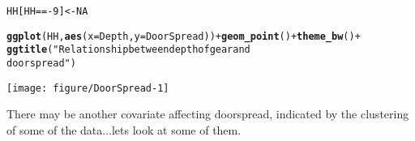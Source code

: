 \documentclass[12pt]{article}\usepackage[]{graphicx}\usepackage[]{color}
\makeatletter
\def\maxwidth{ %
  \ifdim\Gin@nat@width>\linewidth
    \linewidth
  \else
    \Gin@nat@width
  \fi
}
\newcommand{\hlnum}[1]{\textcolor[rgb]{0.686,0.059,0.569}{#1}}%
\newcommand{\hlstr}[1]{\textcolor[rgb]{0.192,0.494,0.8}{#1}}%
\newcommand{\hlopt}[1]{\textcolor[rgb]{0,0,0}{#1}}%
\newcommand{\hlstd}[1]{\textcolor[rgb]{0.345,0.345,0.345}{#1}}%
\newcommand{\hlkwb}[1]{\textcolor[rgb]{0.69,0.353,0.396}{#1}}%
\newcommand{\hlkwc}[1]{\textcolor[rgb]{0.333,0.667,0.333}{#1}}%
\newcommand{\hlkwd}[1]{\textcolor[rgb]{0.737,0.353,0.396}{\textbf{#1}}}%
\newenvironment{kframe}{%
 \def\at@end@of@kframe{}%
 \ifinner\ifhmode%
  \def\at@end@of@kframe{\end{minipage}}%
  \begin{minipage}{\columnwidth}%
 \fi\fi%
 \def\FrameCommand##1{\hskip\@totalleftmargin \hskip-\fboxsep
 \colorbox{shadecolor}{##1}\hskip-\fboxsep
     \hskip-\linewidth \hskip-\@totalleftmargin \hskip\columnwidth}%
 \MakeFramed {\advance\hsize-\width
   \@totalleftmargin\z@ \linewidth\hsize
   \@setminipage}}%
 {\par\unskip\endMakeFramed%
 \at@end@of@kframe}
\newenvironment{knitrout}{}{} %
\makeatother
\begin{document}
\begin{knitrout}
\begin{kframe}
\begin{alltt}
\hlstd{HH[HH} \hlopt{== -}\hlnum{9}\hlstd{]} \hlkwb{<-} \hlnum{NA}

\hlkwd{ggplot}\hlstd{(HH,} \hlkwd{aes}\hlstd{(}\hlkwc{x} \hlstd{= Depth,} \hlkwc{y} \hlstd{= DoorSpread))} \hlopt{+} \hlkwd{geom_point}\hlstd{()} \hlopt{+} \hlkwd{theme_bw}\hlstd{()} \hlopt{+}
    \hlkwd{ggtitle}\hlstd{(}\hlstr{"Relationship between depth of gear and
     door spread"}\hlstd{)}
\end{alltt}
\end{kframe}

{\centering \texttt{[image: figure/DoorSpread-1]} 

}



\end{knitrout}

There may be another covariate affecting doorspread, indicated by the
clustering of some of the data...lets look at some of them.
\end{document}
